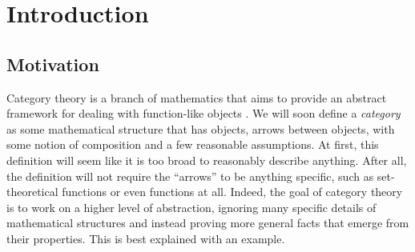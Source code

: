 \documentclass[../thesis.tex]{subfiles}
\begin{document}
\chapter{Introduction}

\section{Motivation}

Category theory is a branch of mathematics that aims to provide an abstract framework for dealing with function-like objects \cite{bct}.
We will soon define a \textit{category} as some mathematical structure that has objects, arrows between objects, with some notion of composition and a few reasonable assumptions.
At first, this definition will seem like it is too broad to reasonably describe anything.
After all, the definition will not require the ``arrows'' to be anything specific, such as set-theoretical functions or even functions at all.
Indeed, the goal of category theory is to work on a higher level of abstraction, ignoring many specific details of mathematical structures and instead proving more general facts that emerge from their properties. This is best explained with an example.
\end{document}
